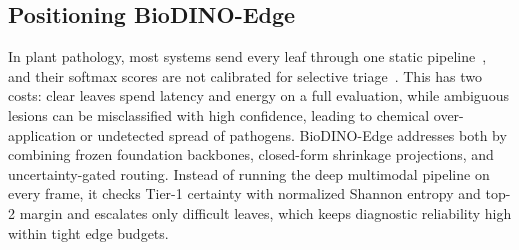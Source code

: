 \subsection{Positioning BioDINO-Edge}
In plant pathology, most systems send every leaf through one static pipeline~\cite{zhao2026lightweight}, and their softmax scores are not calibrated for selective triage~\cite{guo2017calibration}. This has two costs: clear leaves spend latency and energy on a full evaluation, while ambiguous lesions can be misclassified with high confidence, leading to chemical over-application or undetected spread of pathogens. BioDINO-Edge addresses both by combining frozen foundation backbones, closed-form shrinkage projections, and uncertainty-gated routing. Instead of running the deep multimodal pipeline on every frame, it checks Tier-1 certainty with normalized Shannon entropy and top-2 margin and escalates only difficult leaves, which keeps diagnostic reliability high within tight edge budgets.
